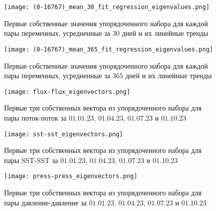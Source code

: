 \begin{figure}
	\centering
	\texttt{[image: (0-16767)\_mean\_30\_fit\_regression\_eigenvalues.png]}
	\caption{Первые собственные значения упорядоченного набора для каждой пары переменных, усредненные за $30$ дней и их линейные тренды}
	\label{fig:eigenvalues_mean_30}
\end{figure}

\begin{figure}
	\centering
	\texttt{[image: (0-16767)\_mean\_365\_fit\_regression\_eigenvalues.png]}
	\caption{Первые собственные значения упорядоченного набора для каждой пары переменных, усредненные за $365$ дней и их линейные тренды}
	\label{fig:eigenvalues_mean_365}
\end{figure}

\begin{figure}
	\centering
	\texttt{[image: flux-flux\_eigenvectors.png]}
	\caption{Первые три собственных вектора из упорядоченного набора для пары поток-поток за $01.01.23$, $01.04.23$, $01.07.23$ и $01.10.23$}
	\label{fig:Flux-Flux_eigenvectors}
\end{figure}

\begin{figure}
	\centering
	\texttt{[image: sst-sst\_eigenvectors.png]}
	\caption{Первые три собственных вектора из упорядоченного набора для пары SST-SST за $01.01.23$, $01.04.23$, $01.07.23$ и $01.10.23$}
	\label{fig:SST-SST_eigenvectors}
\end{figure}

\begin{figure}
	\centering
	\texttt{[image: press-press\_eigenvectors.png]}
	\caption{Первые три собственных вектора из упорядоченного набора для пары давление-давление за $01.01.23$, $01.04.23$, $01.07.23$ и $01.10.23$}
	\label{fig:press-press_eigenvectors}
\end{figure}

